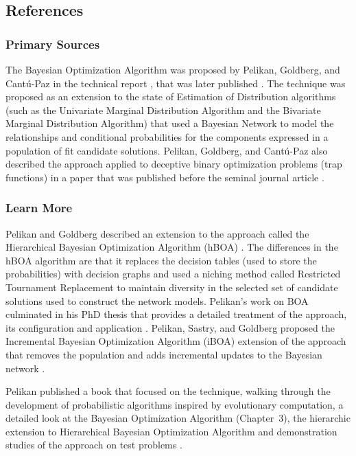 \subsection{References}

% 
% 
\subsubsection{Primary Sources}
The Bayesian Optimization Algorithm was proposed by Pelikan, Goldberg, and Cant\'u-Paz in the technical report \cite{Pelikan1998a}, that was later published \cite{Pelikan2002}. The technique was proposed as an extension to the state of Estimation of Distribution algorithms (such as the Univariate Marginal Distribution Algorithm and the Bivariate Marginal Distribution Algorithm) that used a Bayesian Network to model the relationships and conditional probabilities for the components expressed in a population of fit candidate solutions.
Pelikan, Goldberg, and Cant\'u-Paz also described the approach applied to deceptive binary optimization problems (trap functions) in a paper that was published before the seminal journal article \cite{Pelikan1999a}.

% 
% 
\subsubsection{Learn More}
Pelikan and Goldberg described an extension to the approach called the Hierarchical Bayesian Optimization Algorithm (hBOA) \cite{Pelikan2000, Pelikan2001b}. The differences in the hBOA algorithm are that it replaces the decision tables (used to store the probabilities) with decision graphs and used a niching method called Restricted Tournament Replacement to maintain diversity in the selected set of candidate solutions used to construct the network models.
Pelikan's work on BOA culminated in his PhD thesis that provides a detailed treatment of the approach, its configuration and application \cite{Pelikan2002a}.
Pelikan, Sastry, and Goldberg proposed the Incremental Bayesian Optimization Algorithm (iBOA) extension of the approach that removes the population and adds incremental updates to the Bayesian network \cite{Pelikan2008}.

Pelikan published a book that focused on the technique, walking through the development of probabilistic algorithms inspired by evolutionary computation, a detailed look at the Bayesian Optimization Algorithm (Chapter~3), the hierarchic extension to Hierarchical Bayesian Optimization Algorithm and demonstration studies of the approach on test problems \cite{Pelikan2005}.


